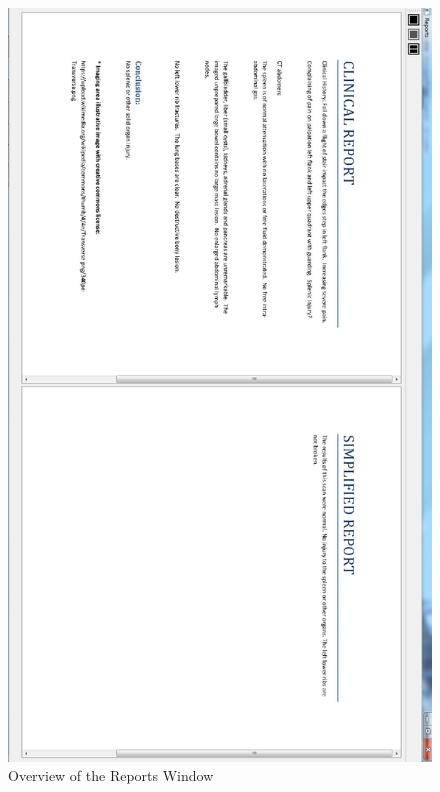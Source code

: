 \begin{figure}[ht]
\centering
\includegraphics[width = 0.71\hsize]{./figures/screenshot/ReportWindow}
\caption{Overview of the Reports Window}
\end{figure}